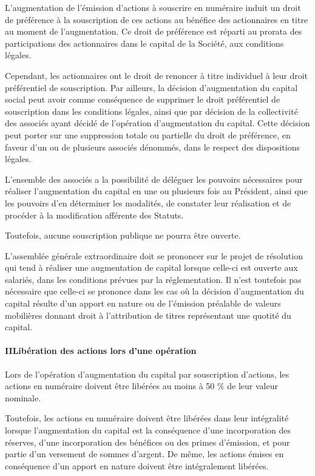\documentclass[a4paper,12pt]{report}
\begin{document}
L'augmentation de l'émission d'actions à souscrire en numéraire induit un droit de préférence à la souscription de ces actions 
au bénéfice des actionnaires en titre au moment de l'augmentation. Ce droit de préférence est réparti au prorata des participations 
des actionnaires dans le capital de la Société, aux conditions légales.

Cependant, les actionnaires ont le droit de renoncer à titre individuel à leur droit préférentiel de souscription. 
Par ailleurs, la décision d'augmentation du capital social peut avoir comme conséquence de supprimer le droit préférentiel de souscription 
dans les conditions légales, ainsi que par décision de la collectivité des associés ayant décidé de l'opération d'augmentation du capital. 
Cette décision peut porter sur une suppression totale ou partielle du droit de préférence, en faveur d'un ou de plusieurs associés dénommés, 
dans le respect des dispositions légales.

L'ensemble des associés a la possibilité de déléguer les pouvoirs nécessaires pour réaliser l'augmentation du capital en une ou plusieurs fois au Président, 
ainsi que les pouvoirs d'en déterminer les modalités, de constater leur réalisation et de procéder à la modification afférente des Statuts.

Toutefois, aucune souscription publique ne pourra être ouverte.

L'assemblée générale extraordinaire doit se prononcer sur le projet de résolution qui tend à réaliser une augmentation de capital 
lorsque celle-ci est ouverte aux salariés, dans les conditions prévues par la réglementation. 
Il n'est toutefois pas nécessaire que celle-ci se prononce dans les cas où la décision d'augmentation du capital résulte d'un apport en nature 
ou de l'émission préalable de valeurs mobilières donnant droit à l'attribution de titres représentant une quotité du capital.

\paragraph{II\hspace{4mm}Libération des actions lors d'une opération\\}

Lors de l'opération d'augmentation du capital par souscription d'actions, les actions en numéraire doivent être libérées au moins à 50 \% de leur valeur nominale.

Toutefois, les actions en numéraire doivent être libérées dans leur intégralité lorsque l'augmentation du capital est la conséquence d'une incorporation des réserves, 
d'une incorporation des bénéfices ou des primes d'émission, et pour partie d'un versement de sommes d'argent. 
De même, les actions émises en conséquence d'un apport en nature doivent être intégralement libérées.
\end{document}
